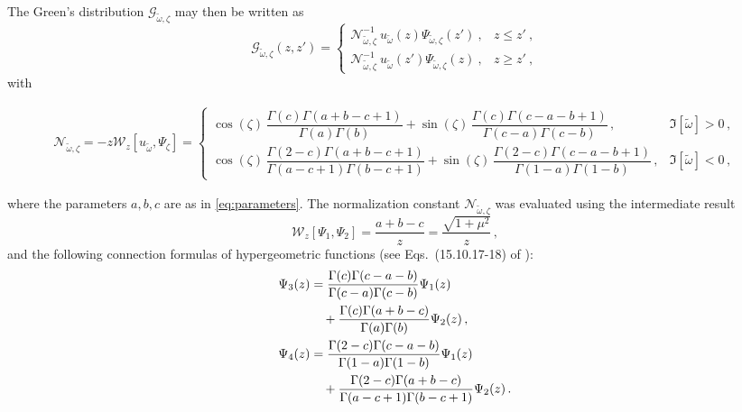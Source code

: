 \documentclass[aps, prd, amsmath, floats, floatfix, twocolumn, nofootinbib, superscriptaddress, showpacs]{revtex4-1}
\def\cG{\mathcal{G}}
\def\tomega{{\tilde{\omega}}}
\begin{document}
The Green's distribution $\cG_{\tomega,\zeta}$ may then be written as
\begin{equation}
\cG_{\tomega,\zeta}(z,z')
= 
\begin{cases}
\mathcal{N}^{-1}_{\tomega,\zeta}\ u_\tomega(z) \Psi_{\tomega,\zeta}(z') \ , & z\leqslant z' \ , \\
\mathcal{N}^{-1}_{\tomega,\zeta}\ u_\tomega(z') \Psi_{\tomega,\zeta}(z) \ , & z\geqslant z' \ ,
\end{cases} 
\label{eq:radial_Green_BC}
\end{equation}
%
with
%
\begin{widetext}
	\begin{align}
	\mathcal{N}_{\tilde{\omega},\zeta} = - z \mathcal{W}_z \left[u_{\tilde{\omega}},\Psi_{\zeta}\right]
	= \begin{cases} 
	\cos(\zeta) \, \dfrac{\Gamma(c)\Gamma(a+b-c+1)}{\Gamma(a)\Gamma(b)} + \sin(\zeta) \, \dfrac{\Gamma(c)\Gamma(c-a-b+1)}{\Gamma(c-a)\Gamma(c-b)} \, , & \Im[\tilde{\omega}] > 0 \, , \\
	\cos(\zeta) \, \dfrac{\Gamma(2-c)\Gamma(a+b-c+1)}{\Gamma(a-c+1)\Gamma(b-c+1)} + \sin(\zeta) \, \dfrac{\Gamma(2-c)\Gamma(c-a-b+1)}{\Gamma(1-a)\Gamma(1-b)} \, , & \Im[\tilde{\omega}] < 0 \, ,
	\end{cases} \label{eq:Wronski_BC}
	\end{align}
\end{widetext}
%
where the parameters $a,b,c$ are as in \eqref{eq:parameters}. The normalization constant $\mathcal{N}_{\tilde{\omega},\zeta}$ was evaluated using the intermediate result
$$\mathcal{W}_z[\Psi_1,\Psi_2] = \frac{a+b-c}{z} = \frac{\sqrt{1+\mu^2}}{z} \, , $$
and the following connection formulas of hypergeometric functions (see Eqs.~(15.10.17-18) of \cite{NIST}):
%
\begin{subequations}
	\begin{align} 
	\Psi_3(z) &=
	\frac{\Gamma(c)\Gamma(c-a-b)}{\Gamma(c-a)\Gamma(c-b)}\Psi_1(z) \notag \\ 
	&\quad +\frac{\Gamma(c)\Gamma(a+b-c)}{\Gamma(a)\Gamma(b)}\Psi_2(z) \, , \label{eq:connection3} \\
	\Psi_4(z) &= \frac{\Gamma(2-c)\Gamma(c-a-b)}{\Gamma(1-a)\Gamma(1-b)}\Psi_1(z) \notag \\ 
	&\quad +\frac{\Gamma(2-c)\Gamma(a+b-c)}{\Gamma(a-c+1)\Gamma(b-c+1)}\Psi_2(z) \, . \label{eq:connection4}
	\end{align}
\end{subequations}	
%
\end{document}
